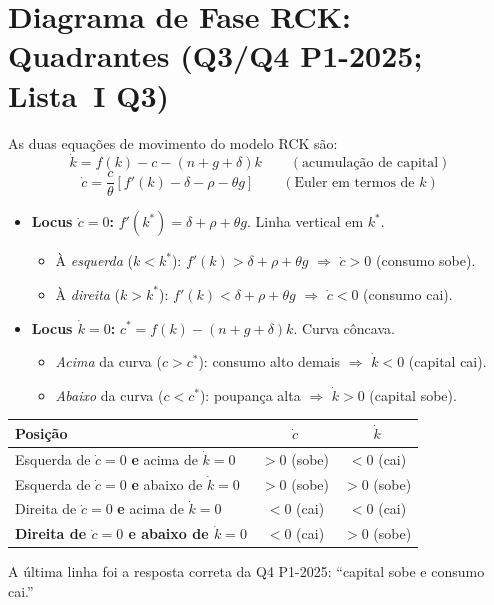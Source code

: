 \documentclass[12pt, a4paper]{article}
\begin{document}
\section{Diagrama de Fase RCK: Quadrantes (Q3/Q4 P1-2025; Lista~I Q3)}

As duas equações de movimento do modelo RCK são:
\[
  \dot k = f(k) - c - (n+g+\delta)k \qquad (\text{acumulação de capital})
\]
\[
  \dot c = \frac{c}{\theta}\!\left[f'(k) - \delta - \rho - \theta g\right] \qquad (\text{Euler em termos de }k)
\]

\begin{formulabox}[title={Os dois loci e seus sinais}]
\begin{itemize}[leftmargin=*]
  \item \textbf{Locus $\dot c = 0$:} $f'(k^*) = \delta + \rho + \theta g$. Linha vertical em $k^*$.
    \begin{itemize}
      \item À \emph{esquerda} ($k < k^*$): $f'(k) > \delta+\rho+\theta g$ $\Rightarrow$ $\dot c > 0$ (consumo sobe).
      \item À \emph{direita} ($k > k^*$): $f'(k) < \delta+\rho+\theta g$ $\Rightarrow$ $\dot c < 0$ (consumo cai).
    \end{itemize}
  \item \textbf{Locus $\dot k = 0$:} $c^* = f(k) - (n+g+\delta)k$. Curva côncava.
    \begin{itemize}
      \item \emph{Acima} da curva ($c > c^*$): consumo alto demais $\Rightarrow$ $\dot k < 0$ (capital cai).
      \item \emph{Abaixo} da curva ($c < c^*$): poupança alta $\Rightarrow$ $\dot k > 0$ (capital sobe).
    \end{itemize}
\end{itemize}
\end{formulabox}

\begin{fatorbox}[title={Mapa dos quatro quadrantes}]
\begin{center}
\begin{tabular}{lcc}
\toprule
Posição & $\dot c$ & $\dot k$ \\
\midrule
Esquerda de $\dot c=0$ \textbf{e} acima de $\dot k=0$ & $>0$ (sobe) & $<0$ (cai) \\
Esquerda de $\dot c=0$ \textbf{e} abaixo de $\dot k=0$ & $>0$ (sobe) & $>0$ (sobe) \\
Direita de $\dot c=0$ \textbf{e} acima de $\dot k=0$ & $<0$ (cai) & $<0$ (cai) \\
\textbf{Direita de $\dot c=0$ e abaixo de $\dot k=0$} & $<0$ (cai) & $>0$ (sobe) \\
\bottomrule
\end{tabular}
\end{center}
A última linha foi a resposta correta da Q4 P1-2025: ``capital sobe e consumo cai.''
\end{fatorbox}
\end{document}

